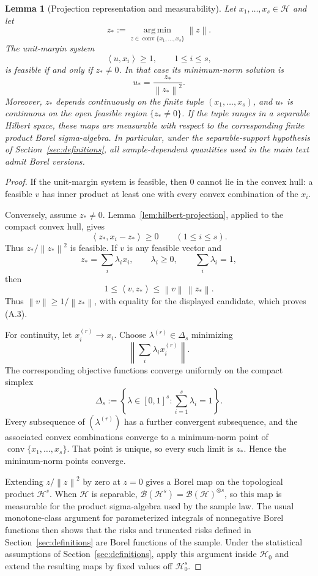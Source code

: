 \documentclass[11pt]{article}
\newtheorem{lemma}[theorem]{Lemma}
\theoremstyle{definition}
\theoremstyle{remark}
\newcommand{\Hh}{\mathcal H}
\newcommand{\ip}[2]{\left\langle #1,#2\right\rangle}
\newcommand{\norm}[1]{\left\lVert #1\right\rVert}
\newcommand{\argminop}{\operatorname*{arg\,min}}
\newcommand{\conv}{\operatorname{conv}}
\begin{document}
\begin{lemma}[Projection representation and measurability]
\label{lem:projection}
Let \(x_1,\ldots,x_s\in\Hh\) and let
\[
 z_*:=
 \argminop_{z\in\conv\{x_1,\ldots,x_s\}}\norm z.
\]
The unit-margin system
\[
 \ip{u}{x_i}\ge1,\qquad 1\le i\le s,
\]
is feasible if and only if \(z_*\ne0\). In that case its minimum-norm
solution is
\[
 \boxed{u_*=\frac{z_*}{\norm{z_*}^2}.}
 \tag{A.3}
\]
Moreover, \(z_*\) depends continuously on the finite tuple
\((x_1,\ldots,x_s)\), and \(u_*\) is continuous on the open feasible region
\(\{z_*\ne0\}\). If the tuple ranges in a separable Hilbert space, these maps
are measurable with respect to the corresponding finite product Borel
sigma-algebra. In particular, under the separable-support hypothesis of Section~\ref{sec:definitions},
all sample-dependent quantities used in the main text admit Borel versions.
\end{lemma}

\begin{proof}
If the unit-margin system is feasible, then \(0\) cannot lie in the convex
hull: a feasible \(v\) has inner product at least one with every convex
combination of the \(x_i\).

Conversely, assume \(z_*\ne0\). Lemma~\ref{lem:hilbert-projection}, applied
to the compact convex hull, gives
\[
 \ip{z_*}{x_i-z_*}\ge0\qquad(1\le i\le s).
\]
Thus \(z_*/\norm{z_*}^2\) is feasible. If \(v\) is any feasible vector and
\[
 z_*=\sum_i\lambda_i x_i,
 \qquad
 \lambda_i\ge0,
 \qquad
 \sum_i\lambda_i=1,
\]
then
\[
 1\le\ip{v}{z_*}\le\norm v\,\norm{z_*}.
\]
Thus \(\norm v\ge1/\norm{z_*}\), with equality for the displayed candidate,
which proves (A.3).

For continuity, let \(x_i^{(r)}\to x_i\). Choose
\(\lambda^{(r)}\in\Delta_s\) minimizing
\[
 \norm{\sum_i\lambda_i x_i^{(r)}}.
\]
The corresponding objective functions converge uniformly on the compact
simplex
\[
 \Delta_s:=\left\{\lambda\in[0,1]^s:\sum_{i=1}^s\lambda_i=1\right\}.
\] Every subsequence of \((\lambda^{(r)})\) has a further
convergent subsequence, and the associated convex combinations converge to a
minimum-norm point of \(\conv\{x_1,\ldots,x_s\}\). That point is unique, so
every such limit is \(z_*\). Hence the minimum-norm points converge.

Extending \(z/\norm z^2\) by zero at \(z=0\) gives a Borel map on the
topological product \(\Hh^s\). When \(\Hh\) is separable,
\(\mathcal B(\Hh^s)=\mathcal B(\Hh)^{\otimes s}\), so this map is measurable
for the product sigma-algebra used by the sample law. The usual
monotone-class argument for parameterized integrals of nonnegative Borel
functions then shows that the risks and truncated risks defined in Section~\ref{sec:definitions} are
Borel functions of the sample. Under the statistical assumptions of
Section~\ref{sec:definitions}, apply this argument inside \(\Hh_0\) and extend the resulting maps
by fixed values off \(\Hh_0^s\).
\end{proof}
\end{document}
